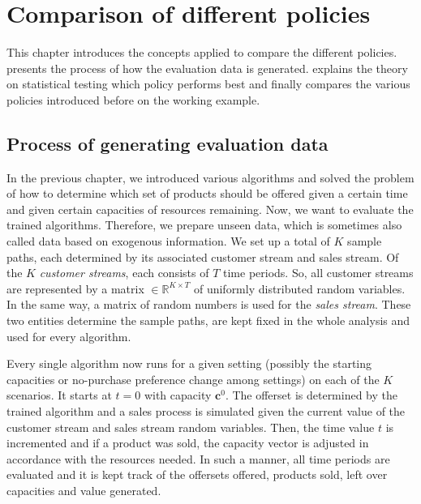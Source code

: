 
\chapter{Comparison of different policies}\label{ch:ComparisonTheory}

This chapter introduces the concepts applied to compare the different policies.  presents the process of how the evaluation data is generated.  explains the theory on statistical testing which policy performs best and  finally compares the various policies introduced before on the working example.

\section{Process of generating evaluation data}\label{s:GenData}

In the previous chapter, we introduced various algorithms and solved the problem of how to determine which set of products should be offered given a certain time and given certain capacities of resources remaining. Now, we want to evaluate the trained algorithms. Therefore, we prepare unseen data, which is sometimes also called data based on exogenous information. We set up a total of $K$ sample paths, each determined by its associated customer stream and sales stream. Of the $K$ \emph{customer streams}, each consists of $T$ time periods. So, all customer streams are represented by a matrix $\in \mathbb{R}^{K\times T}$ of uniformly distributed random variables. In the same way, a matrix of random numbers is used for the \emph{sales stream}. These two entities determine the sample paths, are kept fixed in the whole analysis and used for every algorithm.

Every single algorithm now runs for a given setting (possibly the starting capacities or no-purchase preference change among settings) on each of the $K$ scenarios. It starts at $t=0$ with capacity $\boldsymbol{c}^0$. The offerset is determined by the trained algorithm and a sales process is simulated given the current value of the customer stream and sales stream random variables. Then, the time value $t$ is incremented and if a product was sold, the capacity vector is adjusted in accordance with the resources needed. In such a manner, all time periods are evaluated and it is kept track of the offersets offered, products sold, left over capacities and value generated.

